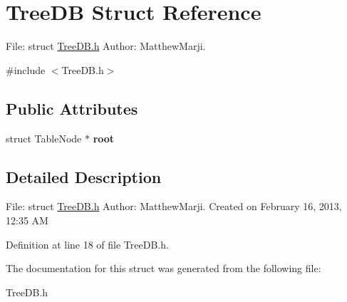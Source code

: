 \hypertarget{structTreeDB}{
\section{TreeDB Struct Reference}
\label{structTreeDB}
}


File: struct \hyperlink{TreeDB_8h_source}{TreeDB.h} Author: MatthewMarji.  




{\ttfamily \#include $<$TreeDB.h$>$}

\subsection*{Public Attributes}
\begin{DoxyCompactItemize}
\item 
\hypertarget{structTreeDB_abd644d53ec7df4934208b3b28f0063d6}{
struct TableNode $\ast$ {\bfseries root}}
\label{structTreeDB_abd644d53ec7df4934208b3b28f0063d6}

\end{DoxyCompactItemize}


\subsection{Detailed Description}
File: struct \hyperlink{TreeDB_8h_source}{TreeDB.h} Author: MatthewMarji. Created on February 16, 2013, 12:35 AM 

Definition at line 18 of file TreeDB.h.



The documentation for this struct was generated from the following file:\begin{DoxyCompactItemize}
\item 
TreeDB.h\end{DoxyCompactItemize}
